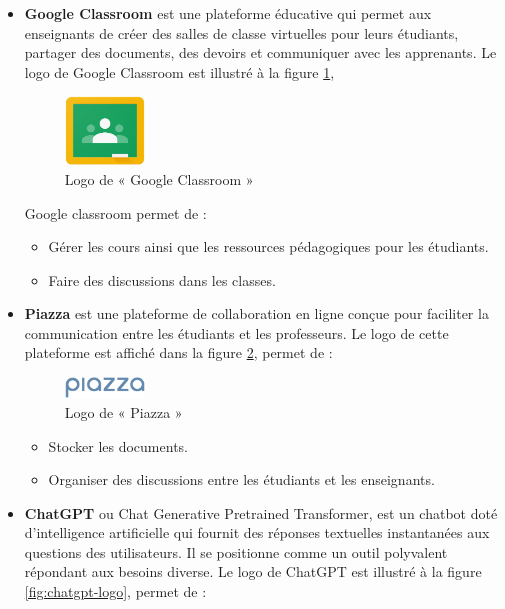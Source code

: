 \begin{itemize}[itemsep=2pt, parsep=2pt]
    \item \textbf{Google Classroom} est une plateforme éducative qui permet aux enseignants de créer des salles de classe virtuelles pour leurs étudiants, partager des documents, des devoirs et communiquer avec les apprenants. Le logo de Google Classroom est illustré à la figure \ref{fig:google-classroom-logo},    
     \begin{figure}[H]
        \centering
        \includegraphics[width=0.2\textwidth]{images/google-classroom-logo.png}
        \caption{Logo de « Google Classroom »}
        \label{fig:google-classroom-logo}
    \end{figure}
    Google classroom permet de :
    \begin{itemize}[itemsep=1pt, parsep=1pt]
        \item Gérer les cours ainsi que les ressources pédagogiques pour les étudiants.
        \item Faire des discussions dans les classes.
    \end{itemize}
    \item \textbf{Piazza} est une plateforme de collaboration en ligne conçue pour faciliter la communication entre les étudiants et les professeurs. Le logo de cette plateforme est affiché dans la figure \ref{fig:piazza-logo}, permet de :
    \begin{figure}[ht]
        \centering
        \includegraphics[width=0.2\textwidth]{images/piazza-logo.png}
        \caption{Logo de « Piazza »}
        \label{fig:piazza-logo}
    \end{figure}
    \begin{itemize}[itemsep=1pt, parsep=1pt]
        \item Stocker les documents.
        \item Organiser des discussions entre les étudiants et les enseignants.
    \end{itemize}
    \item \textbf{ChatGPT} ou Chat Generative Pretrained Transformer, est un chatbot doté d'intelligence artificielle qui fournit des réponses textuelles instantanées aux questions des utilisateurs. Il se positionne comme un outil polyvalent répondant aux besoins diverse. Le logo de ChatGPT est illustré à la figure \ref{fig:chatgpt-logo}, permet de :

\end{itemize}
